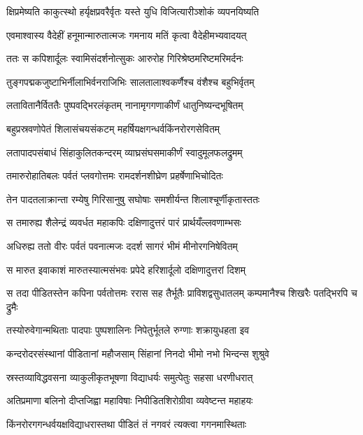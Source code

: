 \twolineshloka
{क्षिप्रमेष्यति काकुत्स्थो हर्यृक्षप्रवरैर्वृतः}
{यस्ते युधि विजित्यारीञ्शोकं व्यपनयिष्यति} %

\twolineshloka
{एवमाश्वास्य वैदेहीं हनूमान्मारुतात्मजः}
{गमनाय मतिं कृत्वा वैदेहीमभ्यवादयत्} %

\twolineshloka
{ततः स कपिशार्दूलः स्वामिसंदर्शनोत्सुकः}
{आरुरोह गिरिश्रेष्ठमरिष्टमरिमर्दनः} %

\twolineshloka
{तुङ्गपद्मकजुष्टाभिर्नीलाभिर्वनराजिभिः}
{सालतालाश्वकर्णैश्च वंशैश्च बहुभिर्वृतम्} %

\twolineshloka
{लतावितानैर्विततैः पुष्पवद्भिरलंकृतम्}
{नानामृगगणाकीर्णं धातुनिष्यन्दभूषितम्} %

\twolineshloka
{बहुप्रस्रवणोपेतं शिलासंचयसंकटम्}
{महर्षियक्षगन्धर्वकिंनरोरगसेवितम्} %

\twolineshloka
{लतापादपसंबाधं सिंहाकुलितकन्दरम्}
{व्याघ्रसंघसमाकीर्णं स्वादुमूलफलद्रुमम्} %

\twolineshloka
{तमारुरोहातिबलः पर्वतं प्लवगोत्तमः}
{रामदर्शनशीघ्रेण प्रहर्षेणाभिचोदितः} %

\twolineshloka
{तेन पादतलाक्रान्ता रम्येषु गिरिसानुषु}
{सघोषाः समशीर्यन्त शिलाश्चूर्णीकृतास्ततः} %

\twolineshloka
{स तमारुह्य शैलेन्द्रं व्यवर्धत महाकपिः}
{दक्षिणादुत्तरं पारं प्रार्थयँल्लवणाम्भसः} %

\twolineshloka
{अधिरुह्य ततो वीरः पर्वतं पवनात्मजः}
{ददर्श सागरं भीमं मीनोरगनिषेवितम्} %

\twolineshloka
{स मारुत इवाकाशं मारुतस्यात्मसंभवः}
{प्रपेदे हरिशार्दूलो दक्षिणादुत्तरां दिशम्} %

\threelineshloka
{स तदा पीडितस्तेन कपिना पर्वतोत्तमः}
{ररास सह तैर्भूतैः प्राविशद्वसुधातलम्}
{कम्पमानैश्च शिखरैः पतद्भिरपि च द्रुमैः} %

\twolineshloka
{तस्योरुवेगान्मथिताः पादपाः पुष्पशालिनः}
{निपेतुर्भूतले रुग्णाः शक्रायुधहता इव} %

\twolineshloka
{कन्दरोदरसंस्थानां पीडितानां महौजसाम्}
{सिंहानां निनदो भीमो नभो भिन्दन्स शुश्रुवे} %

\twolineshloka
{स्रस्तव्याविद्धवसना व्याकुलीकृतभूषणा}
{विद्याधर्यः समुत्पेतुः सहसा धरणीधरात्} %

\twolineshloka
{अतिप्रमाणा बलिनो दीप्तजिह्वा महाविषाः}
{निपीडितशिरोग्रीवा व्यवेष्टन्त महाहयः} %

\twolineshloka
{किंनरोरगगन्धर्वयक्षविद्याधरास्तथा}
{पीडितं तं नगवरं त्यक्त्वा गगनमास्थिताः} %

